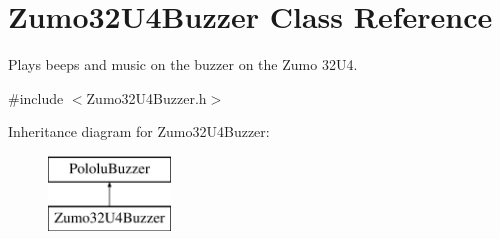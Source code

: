 \hypertarget{class_zumo32_u4_buzzer}{}\section{Zumo32\+U4\+Buzzer Class Reference}
\label{class_zumo32_u4_buzzer}


Plays beeps and music on the buzzer on the Zumo 32\+U4.  




{\ttfamily \#include $<$Zumo32\+U4\+Buzzer.\+h$>$}

Inheritance diagram for Zumo32\+U4\+Buzzer\+:\begin{figure}[H]
\begin{center}
\leavevmode
\includegraphics[height=2.000000cm]{class_zumo32_u4_buzzer}
\end{center}
\end{figure}
